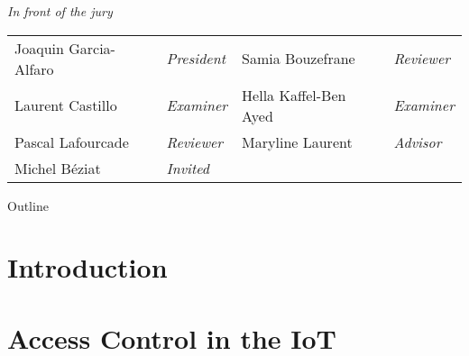 \documentclass[table]{beamer}
\begin{document}
  

\begin{frame}[plain]
\maketitle
\small
{\centering\itshape In front of the jury\par}
\vskip 2mm
\begin{tabular}{l l l l}
Joaquin Garcia-Alfaro & \emph{President} & Samia Bouzefrane & \emph{Reviewer}\\
Laurent Castillo & \emph{Examiner} &  Hella Kaffel-Ben Ayed & \emph{Examiner}\\
Pascal Lafourcade & \emph{Reviewer} & Maryline Laurent & \emph{Advisor}\\
Michel B\'eziat & \emph{Invited} & &\\
\end{tabular}%
\end{frame}

\begin{frame}{Outline}
  \tableofcontents[hideallsubsections]
\end{frame}


\section{Introduction}



\section{Access Control in the IoT}



\end{document}
